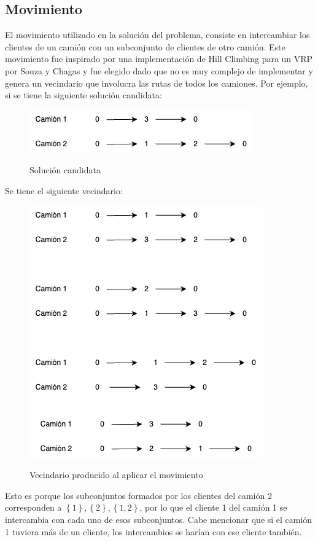 \documentclass{article}
\begin{document}
\subsection{Movimiento}
El movimiento utilizado en la solución del problema, consiste en intercambiar los clientes de un camión con un subconjunto de clientes de otro camión. Este movimiento fue inspirado por una implementación de Hill Climbing para un VRP por Souza y Chagas \cite{souza2020late} y fue elegido dado que no es muy complejo de implementar y genera un vecindario que involucra las rutas de todos los camiones. Por ejemplo, si se tiene la siguiente solución candidata:

\begin{figure}[H]
    \includegraphics[scale = 0.5]{images/sol.png}
    \label{fig: candidatesol}
    \caption{Solución candidata}
\end{figure}

Se tiene el siguiente vecindario:
\begin{figure}[H]
    \includegraphics[scale = 0.5]{images/vecindario.png}
    \label{fig: neighborhood}
    \caption{Vecindario producido al aplicar el movimiento}
\end{figure}

Esto es porque los subconjuntos formados por los clientes del camión 2 corresponden a $\left\{1\right\}, \left\{2\right\}, \left\{1,2\right\}$, por lo que el cliente 1 del camión 1 se intercambia con cada uno de esos subconjuntos. Cabe mencionar que si el camión 1 tuviera más de un cliente, los intercambios se harían con ese cliente también.
\end{document}
